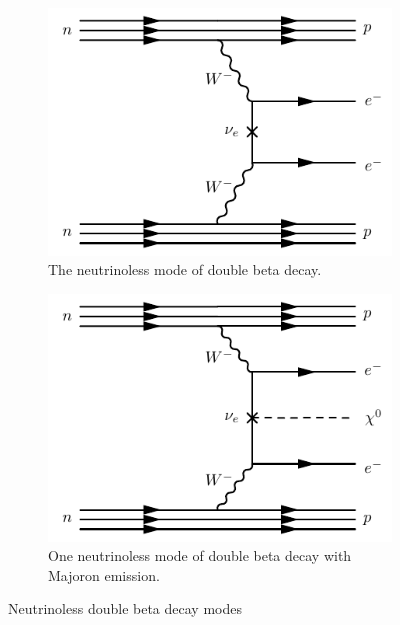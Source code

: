 \documentclass[herrin-thesis.tex]{subfiles}
\begin{document}
\begin{figure}[htp]
         \begin{subfigure}[b]{0.48\textwidth}
		\centering
		\includegraphics[width=\textwidth]{./feynman_diagrams/zeronubetabeta.pdf}
		\caption[\(0\nu\beta\beta\) decay]{The neutrinoless mode of double beta decay.}
		\label{fig:nu_diagram_0nubb}
	\end{subfigure}\hfill%
         \begin{subfigure}[b]{0.48\textwidth}
		\centering
		\includegraphics[width=\textwidth]{./feynman_diagrams/zeronubetabetamajoron.pdf}
		\caption[\(0\nu\beta\beta\chi^0\) decay]{One neutrinoless mode of double beta decay with Majoron emission.}
		\label{fig:nu_diagram_0nubbX}
	\end{subfigure}
	\caption[Neutrinoless double beta decay modes]{Neutrinoless double beta decay modes}
	\label{fig:nu_diagrams}
\end{figure}
\end{document}
